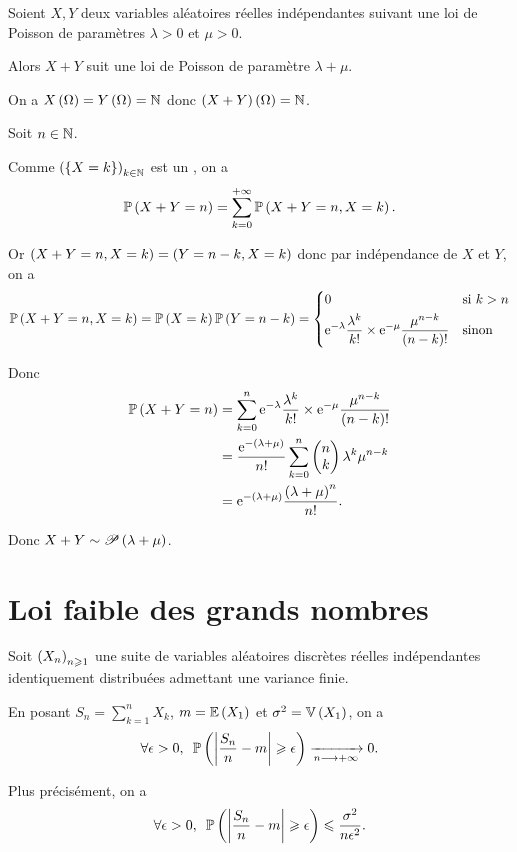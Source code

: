 \begin{prop}
Soient \(X,Y\) deux variables aléatoires réelles indépendantes suivant une loi de Poisson de paramètres \(\lambda>0\) et \(\mu>0\).

Alors \(X+Y\) suit une loi de Poisson de paramètre \(\lambda+\mu\).
\end{prop}

\begin{dem}
On a \(X\paren{\Omega}=Y\paren{\Omega}=\N\) donc \(\paren{X+Y}\paren{\Omega}=\N\).

Soit \(n\in\N\).

Comme \(\paren{\accol{X=k}}_{k\in\N}\) est un \sce, on a \[\proba{X+Y=n}=\sum_{k=0}^{\pinf}\proba{X+Y=n,X=k}.\]

Or \(\paren{X+Y=n,X=k}=\paren{Y=n-k,X=k}\) donc par indépendance de \(X\) et \(Y\), on a \[\proba{X+Y=n,X=k}=\proba{X=k}\proba{Y=n-k}=\begin{dcases}
0 &\text{si }k>n \\
\e{-\lambda}\dfrac{\lambda^k}{k!}\times\e{-\mu}\dfrac{\mu^{n-k}}{\paren{n-k}!} &\text{sinon}
\end{dcases}\]

Donc \[\begin{aligned}
\proba{X+Y=n}&=\sum_{k=0}^{n}\e{-\lambda}\dfrac{\lambda^k}{k!}\times\e{-\mu}\dfrac{\mu^{n-k}}{\paren{n-k}!} \\
&=\dfrac{\e{-\paren{\lambda+\mu}}}{n!}\sum_{k=0}^{n}\binom{k}{n}\lambda^k\mu^{n-k} \\
&=\e{-\paren{\lambda+\mu}}\dfrac{\paren{\lambda+\mu}^n}{n!}.
\end{aligned}\]

Donc \(X+Y\sim\loipoisson{\lambda+\mu}\).
\end{dem}

\section{Loi faible des grands nombres}

\begin{prop}
Soit \(\paren{X_n}_{n\geq1}\) une suite de variables aléatoires discrètes réelles indépendantes identiquement distribuées admettant une variance finie.

En posant \(S_n=\sum_{k=1}^nX_k\), \(m=\esp{X_1}\) et \(\sigma^2=\vari{X_1}\), on a \[\quantifs{\forall\epsilon>0}\proba{\abs{\dfrac{S_n}{n}-m}\geq\epsilon}\tendqd{n\to\pinf}0.\]

Plus précisément, on a \[\quantifs{\forall\epsilon>0}\proba{\abs{\dfrac{S_n}{n}-m}\geq\epsilon}\leq\dfrac{\sigma^2}{n\epsilon^2}.\]
\end{prop}

